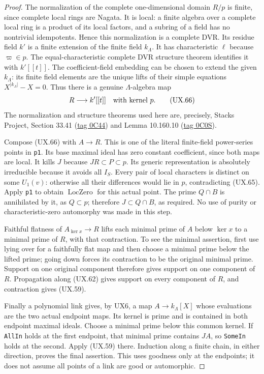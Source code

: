 \begin{proof}
The normalization of the complete
one-dimensional domain $R/p$ is
finite, since complete local rings
are Nagata.  It is local: a finite
algebra over a complete local ring
is a product of its local factors,
and a subring of a field has no
nontrivial idempotents.  Hence this
normalization is a complete DVR.
Its residue field $k'$ is a finite
extension of the finite field $k_\Lambda$.
It has characteristic $\ell$ because
$\varpi\in p$.  The equal-characteristic
complete DVR structure theorem
identifies it with $k'[[t]]$.
The coefficient-field embedding can
be chosen to extend the given
$k_\Lambda$: its finite field
elements are the unique lifts of
their simple equations
$X^{|k_\Lambda|}-X=0$.
Thus there is a genuine
$\Lambda$-algebra map
\[
 R\longrightarrow k'[[t]]
                  \quad\hbox{with kernel }p .
 \tag{UX.66}
\]
The normalization and structure
theorems used here are, precisely,
Stacks Project, Section 33.41
(\href{https://stacks.math.columbia.edu/tag/0C44}{tag 0C44})
and Lemma 10.160.10
(\href{https://stacks.math.columbia.edu/tag/0C0S}{tag 0C0S}).

Compose (UX.66) with $A\to R$.
This is one of the literal finite-field
power-series points in \texttt{p1}.
Its base maximal ideal has zero
constant coefficient, since both
maps are local.  It kills $J$ because
$JR\subset P\subset p$.
Its generic representation is
absolutely irreducible because
it avoids all $I_S$.  Every pair
of local characters is distinct
on some $U_1(v)$: otherwise all
their differences would lie in
$p$, contradicting (UX.65).
Apply \texttt{p1} to obtain
$\operatorname{LocZero}$ for this
actual point.  The prime
$Q\cap B$ is annihilated by it,
as $Q\subset p$; therefore
$J\subset Q\cap B$, as required.
No use of purity or characteristic-zero
automorphy was made in this step.

Faithful flatness of
$A_{\ker x}\to R$ lifts each
minimal prime of $A$ below
$\ker x$ to a minimal prime of
$R$, with that contraction.
To see the minimal assertion,
first use lying over for a
faithfully flat map and then
choose a minimal prime below
the lifted prime; going down
forces its contraction to be
the original minimal prime.
Support on one original
component therefore gives
support on one component
of $R$.  Propagation along
(UX.62) gives support on
every component of $R$,
and contraction gives
(UX.59).

Finally a polynomial link gives,
by UX6, a map $A\to k_\Lambda[X]$
whose evaluations are the two
actual endpoint maps.  Its
kernel is prime and is contained
in both endpoint maximal ideals.
Choose a minimal prime below
this common kernel.  If
\texttt{AllIn} holds at the
first endpoint, that minimal
prime contains $JA$, so
\texttt{SomeIn} holds at the
second.  Apply (UX.59) there.
Induction along a finite chain,
in either direction, proves
the final assertion.  This
uses goodness only at the
endpoints; it does not
assume all points of a
link are good or automorphic.
\end{proof}


